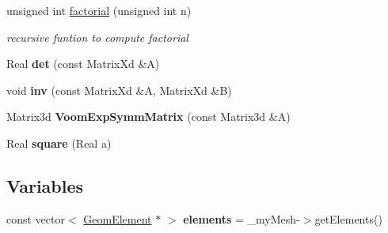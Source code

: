 \begin{DoxyCompactItemize}
\item 
\hypertarget{namespacevoom_a00cddb89f6ad03be4ca8db5515fa5615}{
unsigned int \hyperlink{namespacevoom_a00cddb89f6ad03be4ca8db5515fa5615}{factorial} (unsigned int n)}
\label{namespacevoom_a00cddb89f6ad03be4ca8db5515fa5615}

\begin{DoxyCompactList}\small\item\em recursive funtion to compute factorial \item\end{DoxyCompactList}\item 
\hypertarget{namespacevoom_a402e7c86d4406c26e19717211a78f9af}{
Real {\bfseries det} (const MatrixXd \&A)}
\label{namespacevoom_a402e7c86d4406c26e19717211a78f9af}

\item 
\hypertarget{namespacevoom_a706ccce499faf4d752ef32a1607f1973}{
void {\bfseries inv} (const MatrixXd \&A, MatrixXd \&B)}
\label{namespacevoom_a706ccce499faf4d752ef32a1607f1973}

\item 
\hypertarget{namespacevoom_a21bda4dc298c1ce21afc90ac8b7ff617}{
Matrix3d {\bfseries VoomExpSymmMatrix} (const Matrix3d \&A)}
\label{namespacevoom_a21bda4dc298c1ce21afc90ac8b7ff617}

\item 
\hypertarget{namespacevoom_ad79c23f3d8d827d5b671afa1c5f8c028}{
Real {\bfseries square} (Real a)}
\label{namespacevoom_ad79c23f3d8d827d5b671afa1c5f8c028}

\end{DoxyCompactItemize}
\subsection*{Variables}
\begin{DoxyCompactItemize}
\item 
\hypertarget{namespacevoom_a9adc9296c35fe063d642842663379268}{
const vector$<$ \hyperlink{classvoom_1_1_geom_element}{GeomElement} $\ast$ $>$ {\bfseries elements} = \_\-myMesh-\/$>$getElements()}
\label{namespacevoom_a9adc9296c35fe063d642842663379268}

\end{DoxyCompactItemize}



